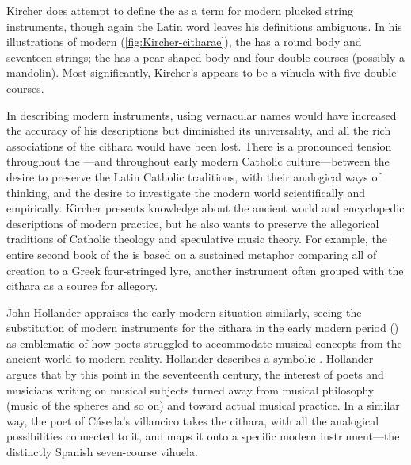 Kircher does attempt to define the  as a term for modern plucked string instruments, though again the Latin word leaves his definitions ambiguous.
In his illustrations of modern  (\cref{fig:Kircher-citharae}), the  has a round body and seventeen strings; the  has a pear-shaped body and four double courses (possibly a mandolin).
Most significantly, Kircher's  appears to be a vihuela with five double courses.



In describing modern instruments, using vernacular names would have increased the accuracy of his descriptions but diminished its universality, and all the rich associations of the cithara would have been lost.
There is a pronounced tension throughout the ---and throughout early modern Catholic culture---between the desire to preserve the Latin Catholic traditions, with their analogical ways of thinking, and the desire to investigate the modern world scientifically and empirically.
Kircher presents  knowledge about the ancient world and encyclopedic descriptions of modern practice, but he also wants to preserve the allegorical traditions of Catholic theology and speculative music theory.
For example, the entire second book of the  is based on a sustained metaphor comparing all of creation to a Greek four-stringed lyre, another instrument often grouped with the cithara as a source for allegory.

John Hollander appraises the early modern situation similarly, seeing the substitution of modern instruments for the cithara in the early modern period () as emblematic of how poets struggled to accommodate musical concepts from the ancient world to modern reality.
Hollander describes a symbolic .%
	\autocite[44--51]{Hollander:Untuning}
Hollander argues that by this point in the seventeenth century, the interest of poets and musicians writing on musical subjects turned away from musical philosophy (music of the spheres and so on) and toward actual musical practice. 
In a similar way, the poet of Cáseda's villancico takes the cithara, with all the analogical possibilities connected to it, and maps it onto a specific modern instrument---the distinctly Spanish seven-course vihuela.

